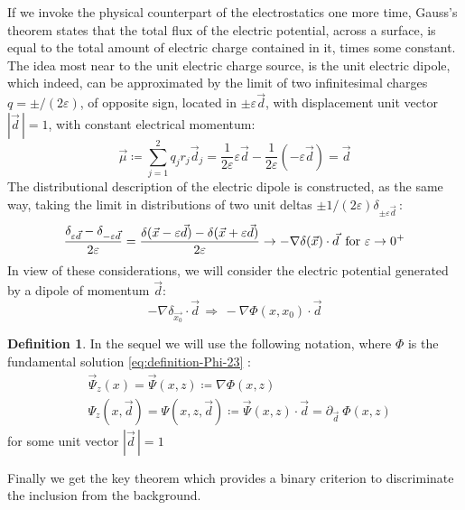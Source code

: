 \documentclass[10pt, a4paper, twoside, openright]{book}
\theoremstyle{definition}
\newtheorem{definition}[subsection]{Definition}
\theoremstyle{plain}
\theoremstyle{plain}
\theoremstyle{plain}
\theoremstyle{plain}
\theoremstyle{plain}
\theoremstyle{plain}
\theoremstyle{plain}
\theoremstyle{plain}
\let\epsilon\varepsilon
\begin{document}
If we invoke the physical counterpart of the electrostatics one more time, Gauss's theorem states that the total flux of the electric potential, across a surface, is equal to the total amount of electric charge contained in it, times some constant.
The idea most near to the unit electric charge source, is the unit electric dipole, which indeed, can be approximated by the limit of two infinitesimal charges $q=\pm/(2\epsilon)$, of opposite sign, located in $\pm\epsilon\vec{d}$, with displacement unit vector $|\vec{d}\,|=1$, with constant electrical momentum:
\begin{equation}
 \vec{\mu}\coloneqq \sum_{j=1}^2 q_jr_j\vec{d}_j=\dfrac{1}{2\epsilon}\epsilon\vec{d} -\dfrac{1}{2\epsilon}(-\epsilon\vec{d})=\vec{d}
\end{equation}
The distributional description of the electric dipole is constructed, as the same way, taking the limit in distributions of two unit deltas $\pm1/(2\epsilon)\delta_{\pm\epsilon\vec{d}}\,$:
\begin{equation}
 \dfrac{\delta_{\epsilon\vec{d}} - \delta_{-\epsilon\vec{d}}}{2\epsilon}=\dfrac{\delta(\vec{x} - \epsilon\vec{d}) - \delta(\vec{x}+\epsilon\vec{d})}{2\epsilon}\to -\nabla\delta(\vec{x})\cdot\vec{d}\, \textup{ for }\epsilon\to0^+
\end{equation}
In view of these considerations, we will consider the electric potential generated by a dipole of momentum $\vec{d}$:
\begin{equation}
 -\nabla\delta_{\vec{x_0}}\cdot\vec{d}\, \Longrightarrow\, -\nabla\Phi(x,x_0) \cdot \vec{d}
\end{equation}
\begin{definition}
\label{def:fund-sol-deriv-Psi}
In the sequel we will use the following notation, where $\Phi$ is the fundamental solution \ref{eq:definition-Phi-23} :
\begin{align}
 &\vec{\Psi}_z(x) = \vec{\Psi}(x,z) \coloneqq \nabla\Phi(x,z)\\
 &\Psi_z(x,\vec{d})= \Psi(x,z,\vec{d}) \coloneqq \vec{\Psi}(x,z)\cdot \vec{d} = \partial_{\vec{d}\,\,}\Phi(x,z)
\end{align}
for some unit vector $|\vec{d}\,|=1$
\end{definition}
Finally we get the key theorem which provides a binary criterion to discriminate the inclusion from the background.
\end{document}
